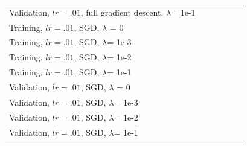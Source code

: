 \documentclass[10pt]{article}
\begin{document}
\begin{table}
\begin{tabular}{llllll}
Validation, $lr = .01$, full gradient descent, $\lambda$= 1e-1 & && \\
Training, $lr = .01$, SGD, $\lambda$ = 0 & && \\
Training, $lr = .01$, SGD, $\lambda$= 1e-3 & && \\
Training, $lr = .01$, SGD, $\lambda$= 1e-2 & && \\
Training, $lr = .01$, SGD, $\lambda$= 1e-1 & && \\
Validation, $lr = .01$, SGD, $\lambda$ = 0 & && \\
Validation, $lr = .01$, SGD, $\lambda$= 1e-3 & && \\
Validation, $lr = .01$, SGD, $\lambda$= 1e-2 & && \\
Validation, $lr = .01$, SGD, $\lambda$= 1e-1 & && \\
\bottomrule
\end{tabular}
\end{table}
	
	
\end{document}
